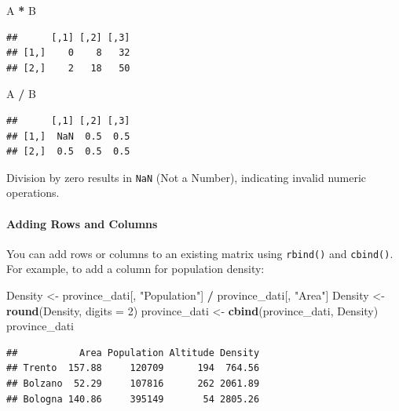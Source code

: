 \documentclass[
]{article}
\newenvironment{Shaded}{\begin{snugshade}}{\end{snugshade}}
\newcommand{\AttributeTok}[1]{\textcolor[rgb]{0.13,0.29,0.53}{#1}}
\newcommand{\DecValTok}[1]{\textcolor[rgb]{0.00,0.00,0.81}{#1}}
\newcommand{\FunctionTok}[1]{\textcolor[rgb]{0.13,0.29,0.53}{\textbf{#1}}}
\newcommand{\NormalTok}[1]{#1}
\newcommand{\OtherTok}[1]{\textcolor[rgb]{0.56,0.35,0.01}{#1}}
\newcommand{\SpecialCharTok}[1]{\textcolor[rgb]{0.81,0.36,0.00}{\textbf{#1}}}
\newcommand{\StringTok}[1]{\textcolor[rgb]{0.31,0.60,0.02}{#1}}
\begin{document}
\begin{Shaded}
\begin{Highlighting}[]
\NormalTok{A }\SpecialCharTok{*}\NormalTok{ B}
\end{Highlighting}
\end{Shaded}

\begin{verbatim}
##      [,1] [,2] [,3]
## [1,]    0    8   32
## [2,]    2   18   50
\end{verbatim}

\begin{Shaded}
\begin{Highlighting}[]
\NormalTok{A }\SpecialCharTok{/}\NormalTok{ B}
\end{Highlighting}
\end{Shaded}

\begin{verbatim}
##      [,1] [,2] [,3]
## [1,]  NaN  0.5  0.5
## [2,]  0.5  0.5  0.5
\end{verbatim}

Division by zero results in \texttt{NaN} (Not a Number), indicating
invalid numeric operations.

\hypertarget{adding-rows-and-columns}{%
\paragraph{Adding Rows and Columns}\label{adding-rows-and-columns}}

You can add rows or columns to an existing matrix using \texttt{rbind()}
and \texttt{cbind()}. For example, to add a column for population
density:

\begin{Shaded}
\begin{Highlighting}[]
\NormalTok{Density }\OtherTok{\textless{}{-}}\NormalTok{ province\_dati[, }\StringTok{"Population"}\NormalTok{] }\SpecialCharTok{/}\NormalTok{ province\_dati[, }\StringTok{"Area"}\NormalTok{]}
\NormalTok{Density }\OtherTok{\textless{}{-}} \FunctionTok{round}\NormalTok{(Density, }\AttributeTok{digits =} \DecValTok{2}\NormalTok{)}
\NormalTok{province\_dati }\OtherTok{\textless{}{-}} \FunctionTok{cbind}\NormalTok{(province\_dati, Density)}
\NormalTok{province\_dati}
\end{Highlighting}
\end{Shaded}

\begin{verbatim}
##           Area Population Altitude Density
## Trento  157.88     120709      194  764.56
## Bolzano  52.29     107816      262 2061.89
## Bologna 140.86     395149       54 2805.26
\end{verbatim}
\end{document}
